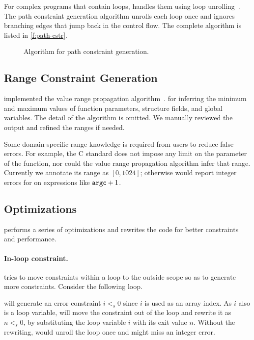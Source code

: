 For complex programs that contain loops, \sys handles them using
loop unrolling~\cite{xie:saturn}.  The path
constraint generation algorithm unrolls each loop once and ignores
branching edges that jump back in the control flow.
The complete algorithm is listed in \autoref{f:path-cstr}.

\begin{figure}

\caption{Algorithm for path constraint generation.}
\label{f:path-cstr}
\end{figure}

\subsection{Range Constraint Generation}
\label{s:gen:range}

\sys implemented the value range propagation
algorithm~\cite{patterson:vrp}.  for inferring the minimum and
maximum values of function parameters, structure fields, and global
variables.  The detail of the algorithm is omitted.  We manually
reviewed the output and refined the ranges if needed.

Some domain-specific range knowledge is required from users to
reduce false errors.  For example, the C standard does not impose
any limit on the  parameter of the  function, nor
could the value range propagation algorithm infer that range.
Currently we annotate its range as $[0, 1024]$; otherwise \sys would
report integer errors for on expressions like $\texttt{argc} + 1$.



\subsection{Optimizations}

\sys performs a series of optimizations and rewrites the code for
better constraints and performance.

\paragraph{In-loop constraint.}
\sys tries to move constraints within a loop to the outside scope
so as to generate more constraints.  Consider the following loop.

\sys will generate an error constraint $i <_s 0$ since $i$ is used
as an array index.  As $i$ also is a loop variable, \sys will move
the constraint out of the loop and rewrite it as $n <_s 0$, by
substituting the loop variable $i$ with its exit value $n$.
%
Without the rewriting, \sys would unroll the loop once and might
miss an integer error.

